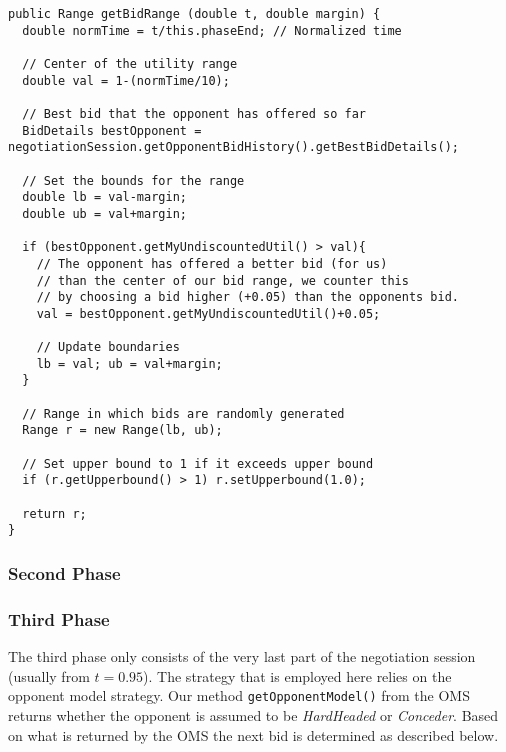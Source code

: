 \begin{lstlisting}[caption=Code for calculating bid range as function of normalized time, label=code:getrangefunctionfirstphase]
public Range getBidRange (double t, double margin) {
  double normTime = t/this.phaseEnd; // Normalized time
  
  // Center of the utility range
  double val = 1-(normTime/10);
  
  // Best bid that the opponent has offered so far
  BidDetails bestOpponent = negotiationSession.getOpponentBidHistory().getBestBidDetails();
  
  // Set the bounds for the range
  double lb = val-margin;
  double ub = val+margin;
  
  if (bestOpponent.getMyUndiscountedUtil() > val){
    // The opponent has offered a better bid (for us)
    // than the center of our bid range, we counter this
    // by choosing a bid higher (+0.05) than the opponents bid.
    val = bestOpponent.getMyUndiscountedUtil()+0.05;
    
    // Update boundaries
    lb = val; ub = val+margin;
  }
  
  // Range in which bids are randomly generated
  Range r = new Range(lb, ub); 
  
  // Set upper bound to 1 if it exceeds upper bound
  if (r.getUpperbound() > 1) r.setUpperbound(1.0);
  
  return r;
}
\end{lstlisting}

\subsubsection{Second Phase}

\subsubsection{Third Phase}

The third phase only consists of the very last part of the negotiation session (usually from $t = 0.95$). The strategy that is employed here relies on the opponent model strategy. Our method \texttt{getOpponentModel()} from the OMS returns whether the opponent is assumed to be \emph{HardHeaded} or \emph{Conceder}. Based on what is returned by the OMS the next bid is determined as described below.

